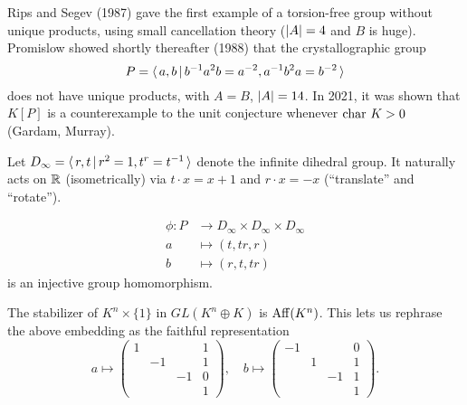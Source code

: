 Rips and Segev (1987) gave the first example of a torsion-free group without unique products, using small cancellation theory ($\lvert A \rvert = 4$ and $B$ is huge).
Promislow showed shortly thereafter (1988) that the crystallographic group \[
    P = \langle \, a, b \, | \, b^{-1} a^2 b = a^{-2}, a^{-1} b^2 a = b^{-2} \, \rangle
\]
does not have unique products, with $A = B$, $\lvert A \rvert = 14$.
In 2021, it was shown that $K[P]$ is a counterexample to the unit conjecture whenever $\mathrm{char}\ K > 0$ (Gardam, Murray).

Let $D_\infty = \langle \, r, t \, | \, r^2 = 1, t^r = t^{-1} \, \rangle$ denote the infinite dihedral group.
It naturally acts on $\mathbb{R}$ (isometrically) via $t \cdot x = x+1$ and $r \cdot x = -x$ (``translate'' and ``rotate'').

\begin{lemma}
    \label{lemma:promislow_embedding}
    \begin{align*}
        \phi \colon P &\to D_\infty \times D_\infty \times D_\infty \\
        a &\mapsto (t, tr, r) \\
        b &\mapsto (r, t, tr)
    \end{align*}
    is an injective group homomorphism.
\end{lemma}

\begin{remark}
    The stabilizer of $K^n \times \{1\}$ in $GL(K^n \oplus K)$ is $\mathrm{Aff}(K^n)$.
    This lets us rephrase the above embedding as the faithful representation \[
        a \mapsto \begin{pmatrix}
            1 &    &    & 1 \\
              & -1 &    & 1 \\
              &    & -1 & 0 \\
              &    &    & 1
        \end{pmatrix},
        \quad
        b \mapsto \begin{pmatrix}
            -1 &   &    & 0 \\
               & 1 &    & 1 \\
               &   & -1 & 1 \\
               &   &    & 1
        \end{pmatrix}.
     \]
\end{remark}

